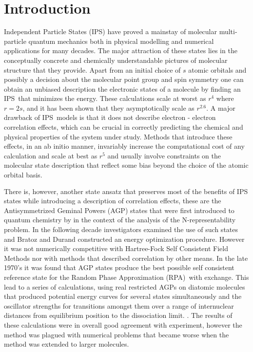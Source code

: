 \documentclass{article}
\begin{document}
\section{Introduction}

Independent Particle States (IPS) have proved a mainstay of molecular
multi-particle quantum mechanics both in physical modelling and numerical
applications for many decades. The major attraction of these states lies in
the conceptually concrete and chemically understandable pictures of
molecular structure that they provide. Apart from an initial choice of $s$
atomic orbitals and possibly a decision about the molecular point group and
spin symmetry one can obtain an unbiased description the electronic states
of a molecule by finding an IPS\ that minimizes the energy. These
calculations scale at worst as $r^{4}$ where $r=2s$, and it has been shown
that they asymptotically scale as $r^{2.6}$. A major drawback of IPS\ models
is that it does not describe electron - electron correlation effects, which
can be crucial in correctly predicting the chemical and physical properties
of the system under study. Methods that introduce these effects, in an ab
initio manner, invariably increase the computational cost of any calculation
and scale at best as $r^{5}$ and usually involve constraints on the
molecular state description that reflect some bias beyond the choice of the
atomic orbital basis.

There is, however, another state ansatz that preserves most of the benefits
of IPS states while introducing a description of correlation effects, these
are the Antisymmetrized Geminal Powers (AGP) states that were first
introduced to quantum chemistry by \cite{Coleman1}\cite{Coleman2} in the
context of the analysis of the N-representability problem. In the following
decade investigators \cite{Kutzenlig1}\cite{Silver1} examined the use of
such states and Bratoz and Durand \cite{Bratoz1} constructed an energy
optimization procedure. However it was not numerically competitive with
Hartree-Fock Self Consistent Field Methods nor with methods that described
correlation by other means. In the late 1970's it was found \cite{Lindeberg1}
that AGP states produce the best possible self consistent reference state
for the Random Phase Approximation (RPA)\ with exchange. This lead to a
series of calculations, using real restricted AGPs on diatomic molecules
that produced potential energy curves for several states simultaneously and
the oscillator strengths for transitions amongst them over a range of
internuclear distances from equilibrium position to the dissociation limit. 
\cite{Kurtz1} \cite{Weiner1}\cite{Weiner2}\cite{Weiner3}\cite{Weiner4}\cite%
{Weiner5}\cite{Sangfelt87}\cite{Edwards1}\cite{Jensen1}\cite{Jensen2}. The
results of these calculations were in overall good agreement with
experiment, however the method was plagued with numerical problems that
became worse when the method was extended to larger molecules.
\end{document}
